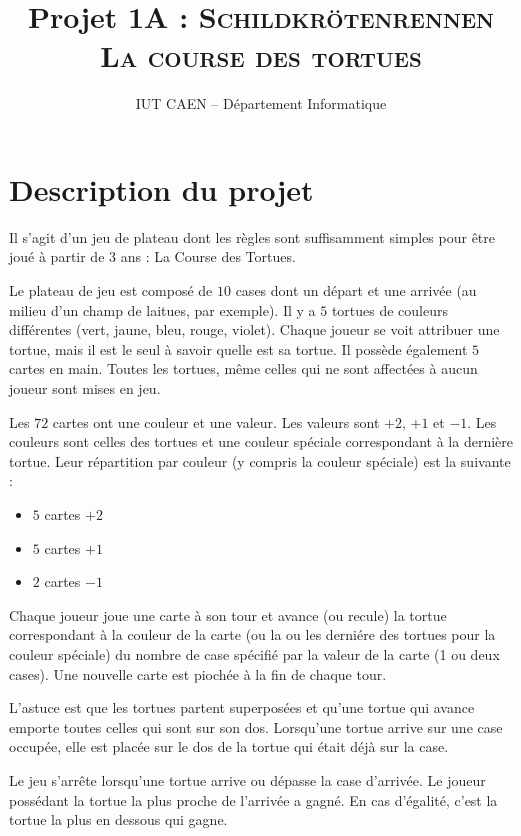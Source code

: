 \documentclass[10pt]{article}
\title{Projet 1A : \textsc{Schildkrötenrennen \\ La course des tortues }}
\author{IUT CAEN -- Département Informatique}
\begin{document}
\maketitle

\pagestyle{empty}

\section{Description du projet}

Il s'agit d'un jeu de plateau dont les règles sont suffisamment
simples pour être joué à partir de 3 ans : La Course des Tortues.

Le plateau de jeu est compos\'e de $10$ cases dont un d\'epart et une
arriv\'ee (au milieu d'un champ de laitues, par exemple). Il y a $5$
tortues de couleurs diff\'erentes (vert, jaune, bleu, rouge, violet).
Chaque joueur se voit attribuer une tortue, mais il est le seul \`a
savoir quelle est sa tortue. Il poss\`ede \'egalement $5$ cartes en main.
Toutes les tortues, m\^eme celles qui ne sont affect\'ees \`a aucun
joueur sont mises en jeu.

Les $72$ cartes ont une couleur et une valeur. Les valeurs sont $+2$, $+1$
et $-1$. Les couleurs sont celles des tortues et une couleur sp\'eciale
correspondant \`a la derni\`ere tortue. Leur r\'epartition par couleur (y
compris la couleur sp\'eciale) est la suivante :
\begin{itemize}
\item $5$ cartes $+2$
\item  $5$ cartes $+1$
\item $2$ cartes $-1$
\end{itemize}

Chaque joueur joue une carte \`a son tour et avance (ou recule) la
tortue correspondant \`a la couleur de la carte (ou la ou les derni\'ere
des tortues pour la couleur sp\'eciale) du nombre de case sp\'ecifi\'e
par la valeur de la carte (1 ou deux cases). Une nouvelle carte est
pioch\'ee \`a la fin de chaque tour.

L'astuce est que les tortues partent superpos\'ees et qu'une tortue qui
avance emporte toutes celles qui sont sur son dos. Lorsqu'une tortue
arrive sur une case occup\'ee, elle est plac\'ee sur le dos de la tortue
qui \'etait d\'ej\`a sur la case.

Le jeu s'arr\^ete lorsqu'une tortue arrive ou d\'epasse la case
d'arriv\'ee. Le joueur poss\'edant la tortue la plus proche de
l'arriv\'ee a gagn\'e. En cas d'\'egalit\'e, c'est la tortue la plus en
dessous qui gagne.
\end{document}
